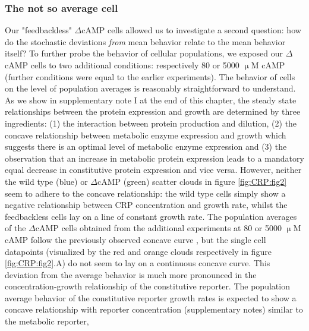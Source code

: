 \subsubsection*{The not so average cell}

Our "feedbackless" $\Delta$cAMP cells allowed us to investigate a second question:
how do the stochastic deviations \textit{from} mean behavior relate to the mean behavior itself?
%
To further probe the behavior of cellular populations, we exposed our $\Delta$cAMP cells to two additional conditions: 
%
respectively 80 or 5000 $\upmu$M cAMP (further conditions were equal to the earlier experiments).
%
The behavior of cells on the level of population averages is reasonably straightforward to understand.
%
As we show in supplementary note I at the end of this chapter, the steady state relationships between the protein expression and growth are determined by three ingredients:
(1) the interaction between protein production and dilution, (2) the concave relationship between metabolic enzyme expression and growth which suggests there is an optimal level of metabolic enzyme expression and (3) the observation that an increase in metabolic protein expression leads to a mandatory equal decrease in constitutive protein expression and vice versa.
%
However, neither the wild type (blue) or $\Delta$cAMP (green) scatter clouds in figure \ref{fig:CRP:fig2} seem to adhere to the concave relationship:
%
the wild type cells simply show a negative relationship between CRP concentration and growth rate, whilst the feedbackless cells lay on a line of constant growth rate.
%
The population averages of the $\Delta$cAMP cells obtained from the additional experiments at  80 or 5000 $\upmu$M cAMP follow the previously observed concave curve \cite{Towbin2017}, 
but the single cell datapoints (visualized by the red and orange clouds respectively in figure \ref{fig:CRP:fig2}.A) do not seem to lay on a continuous concave curve.
%
%
This deviation from the average behavior is much more pronounced in the concentration-growth relationship of the constitutive reporter.
The population average behavior of the constitutive reporter growth rates is expected to show a concave relationship with reporter concentration (supplementary notes) similar to the metabolic reporter,
